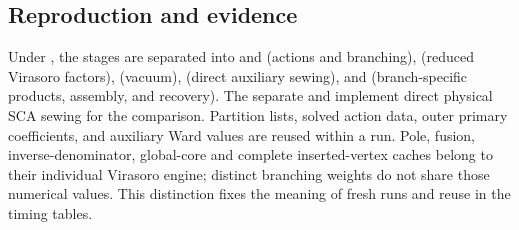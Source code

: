 \documentclass[11pt]{article}
\numberwithin{equation}{section}
\begin{document}


\subsection{Reproduction and evidence}
Under , the stages are separated into
 and  (actions
and branching),  (reduced Virasoro factors),
 (vacuum),  (direct auxiliary sewing),
and  (branch-specific products, assembly, and recovery).
The separate  and 
implement direct physical SCA sewing for the comparison.
Partition lists, solved action data, outer primary coefficients, and auxiliary
Ward values are reused within a run. Pole, fusion, inverse-denominator,
global-core and complete inserted-vertex caches belong
to their individual Virasoro engine; distinct branching weights do not share
those numerical values. This distinction fixes the meaning of fresh runs
and reuse in the timing tables.
\end{document}

